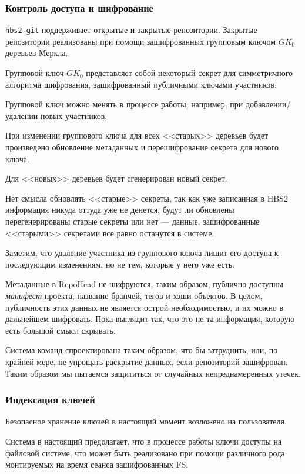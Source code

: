 \documentclass[11pt,a4paper]{article}
\begin{document}
\subsubsection*{Контроль доступа и шифрование}

\texttt{hbs2-git} поддерживает открытые и закрытые репозитории. Закрытые репозитории
реализованы при помощи зашифрованных групповым ключом $GK_0$ деревьев Меркла.

Групповой ключ $GK_0$ представляет собой некоторый секрет для симметричного алгоритма шифрования,
зашифрованный публичными ключами участников.

Групповой ключ можно менять в процессе работы, например, при добавлении/удалении новых участников.

При изменении группового ключа для всех <<старых>> деревьев будет произведено обновление метаданных
и перешифрование секрета для нового ключа.

Для <<новых>> деревьев будет сгенерирован новый секрет.

Нет смысла обновлять <<старые>> секреты, так как уже записанная в HBS2 информация никуда оттуда уже
не денется, будут ли обновлены перегенерированы старые секреты или нет --- данные, зашифрованные
<<старыми>> секретами все равно останутся в системе.

Заметим, что удаление участника из группового ключа лишит его доступа к последующим изменениям, но
не тем, которые у него уже есть.

Метаданные в RepoHead не шифруются, таким образом, публично доступны \textit{манифест} проекта,
название бранчей, тегов и хэши объектов. В целом, публичность этих данных не является острой
необходимостью, и их можно в дальнейшем шифровать. Пока выглядит так, что это не та информация,
которую есть большой смысл скрывать.

Система команд спроектирована таким образом, что бы затруднить, или, по крайней мере, не упрощать
раскрытие данных, если репозиторий зашифрован. Таким образом мы пытаемся защититься от случайных
непреднамеренных утечек.


\subsubsection*{Индексация ключей}

Безопасное хранение ключей в настоящий момент возложено на пользователя.

Система в настоящий предолагает, что в процессе работы ключи доступы
на файловой системе, что может быть реализовано при помощи различного
рода монтируемых на время сеанса зашифрованных FS.
\end{document}
